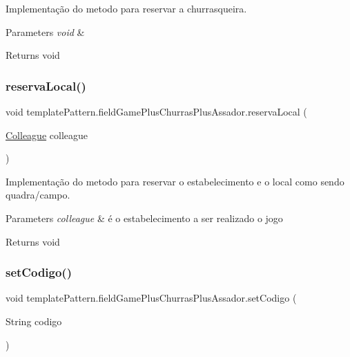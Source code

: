 Implementação do metodo para reservar a churrasqueira. 


\begin{DoxyParams}{Parameters}
{\em void} & \\
\hline
\end{DoxyParams}
\begin{DoxyReturn}{Returns}
void 
\end{DoxyReturn}
\mbox{\label{classtemplate_pattern_1_1field_game_plus_churras_plus_assador_ac3847ab6506c082199221be283d37bb5}} 
\subsubsection{\texorpdfstring{reservaLocal()}{reservaLocal()}}
{\footnotesize\ttfamily void template\+Pattern.\+field\+Game\+Plus\+Churras\+Plus\+Assador.\+reserva\+Local (\begin{DoxyParamCaption}\item[{\mbox{\hyperlink{classmediator_pattern_1_1_colleague}{Colleague}}}]{colleague }\end{DoxyParamCaption})}



Implementação do metodo para reservar o estabelecimento e o local como sendo quadra/campo. 


\begin{DoxyParams}{Parameters}
{\em colleague} & é o estabelecimento a ser realizado o jogo \\
\hline
\end{DoxyParams}
\begin{DoxyReturn}{Returns}
void 
\end{DoxyReturn}
\mbox{\label{classtemplate_pattern_1_1field_game_plus_churras_plus_assador_a018ca545411fec3368a2af7c651e4425}} 
\subsubsection{\texorpdfstring{setCodigo()}{setCodigo()}}
{\footnotesize\ttfamily void template\+Pattern.\+field\+Game\+Plus\+Churras\+Plus\+Assador.\+set\+Codigo (\begin{DoxyParamCaption}\item[{String}]{codigo }\end{DoxyParamCaption})}



